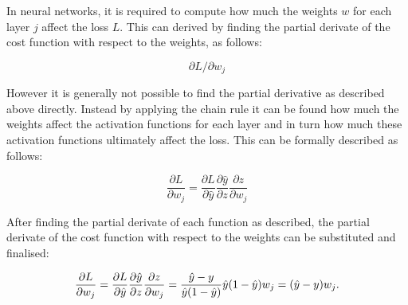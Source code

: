 In neural networks, it is required to compute how much the weights $w$ for each layer $j$  affect  the loss $L$. This can derived by finding the partial derivate of the cost function with respect to the weights, as follows:

\begin{equation}
\partial L / \partial w_j
\end{equation}

However it is generally not possible to find the partial derivative as described above directly. Instead by applying the chain rule it can be found how much the weights affect the activation functions for each layer and in turn how much these activation functions ultimately affect the loss. This can be formally described as follows:

\begin{equation}
\frac{\partial L}{\partial w_j} = \frac{\partial L}{\partial \hat{y}} \frac{\partial \hat{y}}{\partial z} \frac{\partial z}{\partial w_j}
\end{equation}

After finding the partial derivate of each function as described, the partial derivate of the cost function with respect to the weights can be substituted and finalised:

\begin{equation}
    \frac{\partial L}{\partial w_j} = \frac{\partial L}{\partial \hat{y}} \frac{\partial \hat{y}}{\partial z} \frac{\partial z}{\partial w_j}\newline
    = \frac{\hat{y} - y}{\hat{y}(1 - \hat{y})} \hat{y} (1-\hat{y}) w_j\newline
    = (\hat{y} - y) w_j.\newline
 \end{equation}

